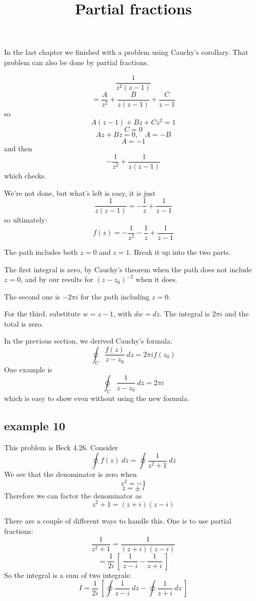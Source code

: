 \documentclass[11pt, oneside]{article}
\title{Partial fractions}
\date{}
\begin{document}
\maketitle
\Large


In the last chapter we finished with a problem using Cauchy's corollary.  That problem can also be done by partial fractions.

\label{sec:ex8PF}

\[ \frac{1}{z^2(z - 1)} \]
\[ = \frac{A}{z^2} + \frac{B}{z(z-1)} + \frac{C}{z - 1} \]
so
\[ A(z-1) + Bz + Cz^2 = 1 \]
\[ C = 0 \]
\[ Az + Bz = 0, \ \ \ \ A = -B \]
\[ A = -1 \]
and then
\[ -\frac{1}{z^2} + \frac{1}{z(z - 1)} \]
which checks.

We're not done, but what's left is easy, it is just
\[ \frac{1}{z(z - 1)} = -\frac{1}{z} + \frac{1}{z - 1} \]
so ultimately:
\[ f(z) = -\frac{1}{z^2} -\frac{1}{z} + \frac{1}{z - 1} \]

The path includes both $z = 0$ and $z = 1$.  Break it up into the two parts.

The first integral is zero, by Cauchy's theorem when the path does not include $z = 0$, and by our results for $(z-z_0)^{-2}$ when it does.

The second one is $-2\pi i$ for the path including $z = 0$.

For the third, substitute $w = z - 1$, with $dw = dz$.  The integral is $2 \pi i$ and the total is zero.



In the previous section, we derived Cauchy's formula:
\[ \oint_C \frac{f(z)}{z-z_0} \ dz = 2 \pi i f(z_0) \]
One example is
\[ \oint_C \frac{1}{z-z_0} \ dz = 2 \pi i \]
which is easy to show even without using the new formula.

\subsection*{example 10}

\label{sec:ex10PF}

This problem is Beck 4.26.  Consider 
\[ \oint f(z) \ dz = \oint \frac{1}{z^2 + 1} \ dz \]
We see that the denominator is zero when
\[ z^2 = -1 \]
\[ z = \pm \ i \]
Therefore we can factor the denominator as
\[ z^2 + 1 = (z + i) (z-i) \]

There are a couple of different ways to handle this.  One is to use partial fractions:
\[ \frac{1}{z^2 + 1} = \frac{1}{(z + i) (z-i)} \]
\[ = \frac{1}{2i} \ [ \ \frac{1}{z - i} - \frac{1}{z+i} \ ] \]
So the integral is a sum of two integrals:
\[ I = \frac{1}{2i} \ [ \oint \frac{1}{z - i}  \ dz -  \oint \frac{1}{z + i} \ dz \ ] \] 
\end{document}
